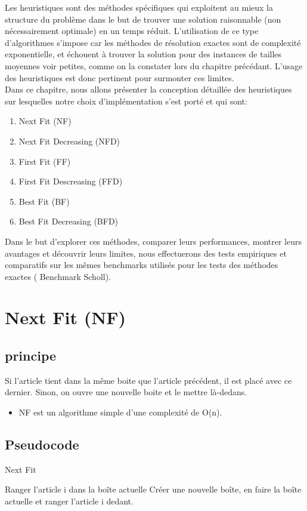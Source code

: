 \documentclass[class=article, crop=false]{standalone}
\begin{document}
\setcounter{section}{0}
Les heuristiques sont des méthodes spécifiques qui exploitent au mieux la structure du 
problème dans le but de trouver une solution raisonnable (non nécessairement optimale) en un temps réduit. 
L’utilisation de ce type d’algorithmes s'impose car les méthodes de résolution exactes sont 
de complexité exponentielle, et échouent à trouver la solution pour des instances de tailles moyennes voir petites,
 comme on la constater lors du chapitre précédant. 
L'usage des heuristiques est donc pertinent pour surmonter ces limites.\\

Dans ce chapitre, nous allons présenter la conception détaillée des heuristiques sur lesquelles notre choix d’implémentation s’est porté et qui sont:
\begin{enumerate}
    \item Next Fit (NF)
    \item Next Fit Decreasing (NFD)
    \item First Fit (FF)
    \item First Fit Descreasing (FFD)
    \item Best Fit (BF)
    \item Best Fit Decreasing (BFD)\\
\end{enumerate}

Dans le but d’explorer ces méthodes, comparer leurs performances, montrer leurs avantages et découvrir leurs limites, nous effectuerons des tests empiriques et comparatifs sur les mêmes  benchmarks utilisés pour les tests des méthodes exactes ( Benchmark Scholl).
\newpage
\section{Next Fit (NF)}
\subsection{principe}
Si l’article tient dans la même boite que l’article précédent, il est placé avec ce dernier. Sinon, on ouvre une nouvelle boite et le mettre là-dedans.
\begin{itemize}
    \item NF est un algorithme simple d’une complexité de O(n). 
\end{itemize}

\subsection{Pseudocode}
\begin{algorithm}[!h]
    \caption{Next Fit}
    \begin{algorithmic}
            \STATE Ranger l’article i dans la boîte actuelle
        \ELSE 
            \STATE Créer une nouvelle boîte, en faire la boîte actuelle et ranger l'article i dedant.
        \ENDIF
    \ENDFOR
    \end{algorithmic}
\end{algorithm}
\end{document}
